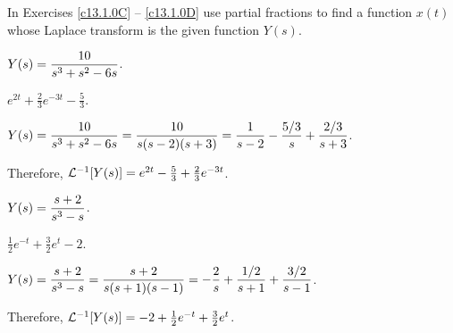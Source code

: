 \documentclass{ximera}
\begin{document}
\noindent In Exercises \ref{c13.1.0C} -- \ref{c13.1.0D} use partial fractions
to find a function $x(t)$ whose Laplace transform is the given function
$Y(s)$.
\begin{exercise} \label{c13.1.0C}
$Y(s) = \displaystyle\frac{10}{s^3+s^2-6s}$.

\begin{solution}
\ans $e^{2t}+\frac{2}{3}e^{-3t}-\frac{5}{3}$.

\soln $Y(s)=\displaystyle\frac{10}{s^3+s^2-6s} = \frac{10}{s(s-2)(s+3)}=
\frac{1}{s-2}-\frac{5/3}{s}+\frac{2/3}{s+3}$.  

Therefore,
${\cal L}^{-1}[Y(s)] = e^{2t}-\frac{5}{3}+\frac{2}{3}e^{-3t}$.


\end{solution}
\end{exercise}
\begin{exercise} \label{c13.1.0D}
$Y(s) = \displaystyle\frac{s+2}{s^3-s}$.

\begin{solution}
\ans $\frac{1}{2}e^{-t} + \frac{3}{2}e^t -2$.

\soln $Y(s) = \displaystyle\frac{s+2}{s^3-s} = \frac{s+2}{s(s+1)(s-1)} =
-\frac{2}{s} + \frac{1/2}{s+1} + \frac{3/2}{s-1}$.

Therefore, ${\cal L}^{-1}[Y(s)] = -2 + \frac{1}{2}e^{-t} + \frac{3}{2}e^t$.


\end{solution}
\end{exercise}
\end{document}
